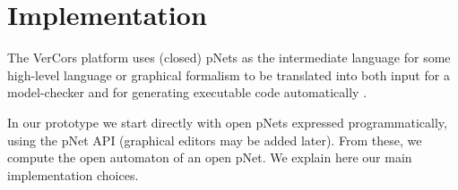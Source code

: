 \documentclass{lncs/llncs}
\begin{document}



\section{Implementation}
\label{section:implementation}
The VerCors platform uses (closed) pNets as the intermediate language
for some high-level language or graphical formalism to be translated
into both input for a 
model-checker and for generating executable code automatically \cite{HKM-FASE16}.

In our prototype we start directly with open pNets expressed
programmatically, using the pNet API (graphical editors may be added
later). From these, we compute
the open automaton of an open pNet. We explain here our main
implementation choices.
%
\end{document}
